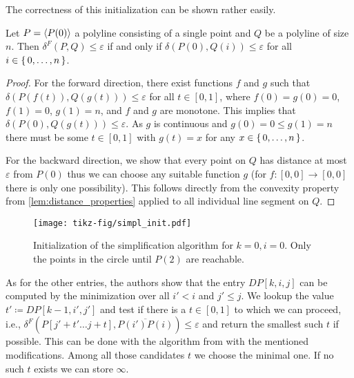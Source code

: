 The correctness of this initialization can be shown rather easily. 
\begin{lemma}
  Let \(P = \left\langle P(0)\right\rangle\) a polyline consisting of a single point and \(Q\) be a polyline of size \(n\). Then \(\delta^F(P, Q) \leq \varepsilon\) if and only if \(\delta(P(0), Q(i)) \leq \varepsilon\) for all \(i \in \set{0, \dots, n}\). 
\end{lemma}
\begin{proof}
  For the forward direction, there exist functions \(f\) and \(g\) such that \(\delta(P(f(t)), Q(g(t))) \leq \varepsilon\) for all \(t\in [0,1]\), where \(f(0) = g(0) = 0\), \(f(1) = 0\), \(g(1) = n\), and \(f\) and \(g\) are  monotone. This implies that \(\delta(P(0), Q(g(t))) \leq \varepsilon\). As \(g\) is continuous and \(g(0) = 0 \leq g(1) = n\) there must be some \(t \in [0,1]\) with \(g(t) = x\) for any \(x\in \set{0, \dots, n}\).
  
  For the backward direction, we show that every point on \(Q\) has distance at most \(\varepsilon\) from \(P(0)\) thus we can choose any suitable function \(g\) (for \(f:[0,0] \to [0,0]\) there is only one possibility). This follows directly from the convexity property from \cref{lem:distance_properties} applied to all individual line segment on \(Q\).
\end{proof}

\begin{figure}[b]
  \centering
  \texttt{[image: tikz-fig/simpl\_init.pdf]}
  \caption{Initialization of the simplification algorithm for \(k = 0, i = 0\). Only the points in the circle until \(P(2)\) are reachable.}
  \label{fig:simpl_init}
\end{figure}


As for the other entries, the authors show that the entry \(DP[k, i, j]\) can be computed by the minimization over all \(i' < i\) and \(j' \leq j\). We lookup the value \(t' \coloneq DP[k-1, i', j']\) and test if there is a \(t \in [0, 1]\) to which we can proceed, i.e., \(\delta^F(P[j' + t' \dots j + t], \overline{P(i')P(i)}) \leq \varepsilon\) and return the smallest such \(t\) if possible. This can be done with the algorithm from \citeauthor{computing_the_frechet_distance_between_two_polygonal_curves} with the mentioned modifications. Among all those candidates \(t\) we choose the minimal one. If no such \(t\) exists we can store \(\infty\).

